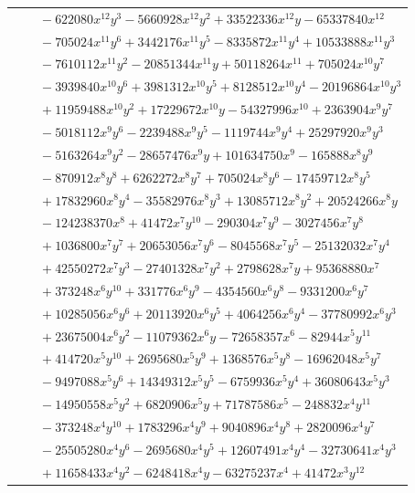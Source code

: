 \documentclass[11pt]{article}
\begin{document}
\begin{longtable}{@{}ll@{}}
 & $\quad -622080x^{12}y^{3}-5660928x^{12}y^{2}+33522336x^{12}y-65337840x^{12}$\\
 & $\quad -705024x^{11}y^{6}+3442176x^{11}y^{5}-8335872x^{11}y^{4}+10533888x^{11}y^{3}$\\
 & $\quad -7610112x^{11}y^{2}-20851344x^{11}y+50118264x^{11}+705024x^{10}y^{7}$\\
 & $\quad -3939840x^{10}y^{6}+3981312x^{10}y^{5}+8128512x^{10}y^{4}-20196864x^{10}y^{3}$\\
 & $\quad +11959488x^{10}y^{2}+17229672x^{10}y-54327996x^{10}+2363904x^{9}y^{7}$\\
 & $\quad -5018112x^{9}y^{6}-2239488x^{9}y^{5}-1119744x^{9}y^{4}+25297920x^{9}y^{3}$\\
 & $\quad -5163264x^{9}y^{2}-28657476x^{9}y+101634750x^{9}-165888x^{8}y^{9}$\\
 & $\quad -870912x^{8}y^{8}+6262272x^{8}y^{7}+705024x^{8}y^{6}-17459712x^{8}y^{5}$\\
 & $\quad +17832960x^{8}y^{4}-35582976x^{8}y^{3}+13085712x^{8}y^{2}+20524266x^{8}y$\\
 & $\quad -124238370x^{8}+41472x^{7}y^{10}-290304x^{7}y^{9}-3027456x^{7}y^{8}$\\
 & $\quad +1036800x^{7}y^{7}+20653056x^{7}y^{6}-8045568x^{7}y^{5}-25132032x^{7}y^{4}$\\
 & $\quad +42550272x^{7}y^{3}-27401328x^{7}y^{2}+2798628x^{7}y+95368880x^{7}$\\
 & $\quad +373248x^{6}y^{10}+331776x^{6}y^{9}-4354560x^{6}y^{8}-9331200x^{6}y^{7}$\\
 & $\quad +10285056x^{6}y^{6}+20113920x^{6}y^{5}+4064256x^{6}y^{4}-37780992x^{6}y^{3}$\\
 & $\quad +23675004x^{6}y^{2}-11079362x^{6}y-72658357x^{6}-82944x^{5}y^{11}$\\
 & $\quad +414720x^{5}y^{10}+2695680x^{5}y^{9}+1368576x^{5}y^{8}-16962048x^{5}y^{7}$\\
 & $\quad -9497088x^{5}y^{6}+14349312x^{5}y^{5}-6759936x^{5}y^{4}+36080643x^{5}y^{3}$\\
 & $\quad -14950558x^{5}y^{2}+6820906x^{5}y+71787586x^{5}-248832x^{4}y^{11}$\\
 & $\quad -373248x^{4}y^{10}+1783296x^{4}y^{9}+9040896x^{4}y^{8}+2820096x^{4}y^{7}$\\
 & $\quad -25505280x^{4}y^{6}-2695680x^{4}y^{5}+12607491x^{4}y^{4}-32730641x^{4}y^{3}$\\
 & $\quad +11658433x^{4}y^{2}-6248418x^{4}y-63275237x^{4}+41472x^{3}y^{12}$\\

\end{longtable}
\end{document}
